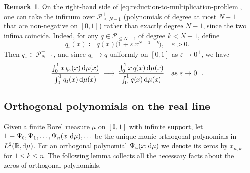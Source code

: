\documentclass[reqno, a4paper]{amsart}
\def\R{\mathbb{R}}
\renewcommand{\d}{\text{\rm d}}
\theoremstyle{plain}
\theoremstyle{definition}
\theoremstyle{remarkstyle}
\newtheorem*{remark}{Remark}
\numberwithin{equation}{section}
\begin{document}
\begin{remark}
On the right-hand side of \eqref{eq:reduction-to-multiplication-problem}, one can take the infimum over $\mathcal{P}_{\leq N-1}^{+}$ (polynomials of degree at most $N-1$ that are non-negative on $[0,1]$) rather than exactly degree $N-1$, since the two infima coincide. Indeed, for any $q \in \mathcal{P}_{\leq N-1}^{+}$ of degree $k < N-1$, define
\begin{equation*}
    q_{\varepsilon}(x) \coloneqq q(x)\bigl(1 + \varepsilon\, x^{N-1-k}\bigr), \quad \varepsilon > 0.
\end{equation*}
Then $q_{\varepsilon} \in \mathcal{P}_{N-1}^{+}$, and since $q_{\varepsilon} \to q$ uniformly on $[0,1]$ as $\varepsilon \to 0^{+}$, we have
\begin{equation*}
    \frac{\int_{0}^{1} x\,q_{\varepsilon}(x)\,\d\mu(x)}{\int_{0}^{1} q_{\varepsilon}(x)\,\d\mu(x)} \;\longrightarrow\; \frac{\int_{0}^{1} x\,q(x)\,\d\mu(x)}{\int_{0}^{1} q(x)\,\d\mu(x)} \quad \text{as } \varepsilon \to 0^{+}.
\end{equation*}
\end{remark}

\medskip

\subsection{Orthogonal polynomials on the real line}
 Given a finite Borel measure $\mu$ on $[0,1]$ with infinite support, let $1\equiv\Psi_0, \Psi_1, \ldots, \Psi_{n}(x;\d\mu), \ldots$ be the unique monic orthogonal polynomials in $L^2(\R, \d\mu)$. 
 For an orthogonal polynomial $\Psi_n(x; \d\mu)$ we denote its zeros by $x_{n, k}$ for $1\leq k\leq n$. 
 The following lemma collects all the necessary facts about the zeros of orthogonal polynomials.
   
\end{document}
